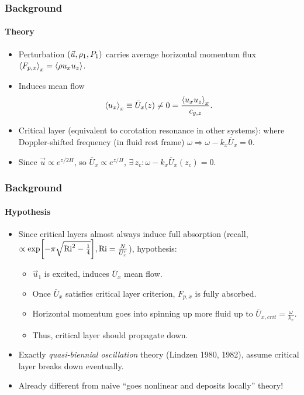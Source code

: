 \documentclass[dvipsnames, 10pt]{beamer}
\DeclarePairedDelimiter\ev{\langle}{\rangle}
\DeclarePairedDelimiter\p{\lparen}{\rparen}
\DeclarePairedDelimiter\s{\lbrack}{\rbrack}
\begin{document}
\begin{frame}
    \frametitle{Background}
    \framesubtitle{Theory}

    \begin{itemize}
        \item Perturbation $\p*{\vec{u}, \rho_1, P_1}$ carries average
            horizontal momentum flux $\ev*{F_{p, x}}_x = \ev*{\rho u_x u_z}$.

        \item Induces mean flow
            \begin{equation}
                 \ev*{u_x}_x \equiv \bar{U}_x(z) \neq 0
                    = \frac{\ev*{u_xu_z}_x}{c_{g, z}}.
            \end{equation}

        \item Critical layer (equivalent to corotation resonance in other
            systems): where Doppler-shifted frequency (in fluid rest frame)
            $\omega \Rightarrow \omega - k_x\bar{U}_x = 0$.

        \item Since $\vec{u} \propto e^{z/2H}$, so $\bar{U}_x \propto e^{z/H}$,
            $\exists \,z_c\!: \omega - k_x\bar{U}_x(z_c) = 0$.
    \end{itemize}
\end{frame}

\begin{frame}
    \frametitle{Background}
    \framesubtitle{Hypothesis}


    \begin{itemize}
        \item Since critical layers almost always induce full absorption
            (recall, $\propto \exp\s*{-\pi \sqrt{\mathrm{Ri}^2 -
            \frac{1}{4}}}, \mathrm{Ri} = \frac{N}{\bar{U}_x'}$),
            hypothesis:

            \begin{itemize}
                \item $\vec{u}_1$ is excited, induces $\bar{U}_x$ mean flow.

                \item Once $\bar{U}_x$ satisfies critical layer criterion,
                    $F_{p, x}$ is fully absorbed.

                \item Horizontal momentum goes into spinning up more fluid up to
                    $\bar{U}_{x, crit} = \frac{\omega}{k_x}$.

                \item Thus, critical layer should propagate down.
            \end{itemize}

        \item Exactly \emph{quasi-biennial oscillation} theory (Lindzen 1980,
            1982), assume critical layer breaks down eventually.

        \item Already different from naive ``goes nonlinear and deposits
            locally'' theory!
    \end{itemize}
\end{frame}
\end{document}
